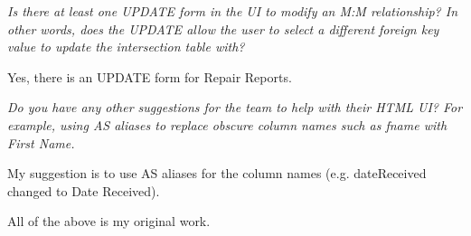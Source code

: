 \documentclass{article}
\begin{document}
\begin{tcolorbox}[colback=secondarycolor, colframe=primarycolor, title=\textbf{Step 3: Peer Review 2 - Paula Tica}]
\vspace{0.2cm}
\textit{Is there at least one UPDATE form in the UI to modify an M:M relationship? In other words, does the UPDATE allow the user to select a different foreign key value to update the intersection table with?}

\vspace{0.05cm}
Yes, there is an UPDATE form for Repair Reports.

\vspace{0.2cm}
\textit{Do you have any other suggestions for the team to help with their HTML UI? For example, using AS aliases to replace obscure column names such as fname with First Name.}

\vspace{0.05cm}
My suggestion is to use AS aliases for the column names (e.g. dateReceived changed to Date Received).

\vspace{0.05cm}
All of the above is my original work.

\end{tcolorbox}

\vspace{0.2cm}
\end{document}
